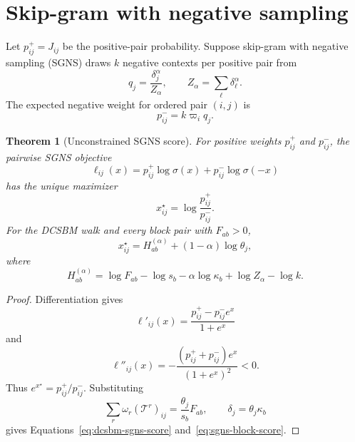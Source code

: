 \documentclass[aps,pre,reprint,superscriptaddress,longbibliography]{revtex4-2}
\newtheorem{theorem}{Theorem}
\begin{document}
\section{Skip-gram with negative sampling}
\label{sec:sgns}

Let \(p^+_{ij}=J_{ij}\) be the positive-pair probability.
Suppose skip-gram with negative sampling (SGNS) draws \(k\) negative contexts per positive pair from
\begin{equation}
    q_j
    =
    \frac{\delta_j^\alpha}{Z_\alpha},
    \qquad
    Z_\alpha=\sum_\ell\delta_\ell^\alpha.
    \label{eq:negative-distribution}
\end{equation}
The expected negative weight for ordered pair \((i,j)\) is
\begin{equation}
    p^-_{ij}=k\varpi_iq_j.
    \label{eq:negative-weight}
\end{equation}

\begin{theorem}[Unconstrained SGNS score]
\label{thm:sgns-score}
For positive weights \(p^+_{ij}\) and \(p^-_{ij}\), the pairwise SGNS objective
\begin{equation}
    \ell_{ij}(x)
    =
    p^+_{ij}\log\sigma(x)
    +
    p^-_{ij}\log\sigma(-x)
    \label{eq:pairwise-sgns}
\end{equation}
has the unique maximizer
\begin{equation}
    x^\star_{ij}
    =
    \log\frac{p^+_{ij}}{p^-_{ij}}.
    \label{eq:pairwise-optimum}
\end{equation}
For the DCSBM walk and every block pair with \(F_{ab}>0\),
\begin{equation}
    x^\star_{ij}
    =
    H^{(\alpha)}_{ab}
    +(1-\alpha)\log\theta_j,
    \label{eq:dcsbm-sgns-score}
\end{equation}
where
\begin{equation}
    H^{(\alpha)}_{ab}
    =
    \log F_{ab}
    -\log s_b
    -\alpha\log\kappa_b
    +\log Z_\alpha
    -\log k.
    \label{eq:sgns-block-score}
\end{equation}
\end{theorem}

\begin{proof}
Differentiation gives
\begin{equation}
    \ell'_{ij}(x)
    =
    \frac{p^+_{ij}-p^-_{ij}e^x}{1+e^x}
\end{equation}
and
\begin{equation}
    \ell''_{ij}(x)
    =
    -\frac{(p^+_{ij}+p^-_{ij})e^x}{(1+e^x)^2}<0.
\end{equation}
Thus \(e^{x^\star}=p^+_{ij}/p^-_{ij}\).
Substituting
\begin{equation}
    \sum_r \omega_r(\mathcal{T}^r)_{ij}
    =
    \frac{\theta_j}{s_b}F_{ab},
    \qquad
    \delta_j=\theta_j\kappa_b
\end{equation}
gives Equations~\eqref{eq:dcsbm-sgns-score} and~\eqref{eq:sgns-block-score}.
\end{proof}
\end{document}
